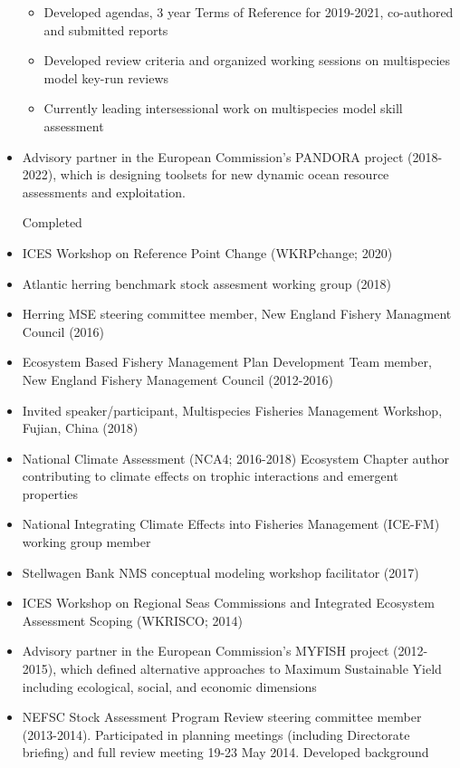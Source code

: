 \documentclass[11pt, a4paper]{awesome-cv}
\providecommand{\tightlist}{%
	\setlength{\itemsep}{0pt}\setlength{\parskip}{0pt}}
\begin{document}
\begin{itemize}
  \begin{itemize}
  \tightlist
  \item
    Developed agendas, 3 year Terms of Reference for 2019-2021,
    co-authored and submitted reports
  \item
    Developed review criteria and organized working sessions on
    multispecies model key-run reviews
  \item
    Currently leading intersessional work on multispecies model skill
    assessment
  \end{itemize}
\item
  Advisory partner in the European Commission's PANDORA project
  (2018-2022), which is designing toolsets for new dynamic ocean
  resource assessments and exploitation.

  Completed
\item
  ICES Workshop on Reference Point Change (WKRPchange; 2020)
\item
  Atlantic herring benchmark stock assesment working group (2018)
\item
  Herring MSE steering committee member, New England Fishery Managment
  Council (2016)
\item
  Ecosystem Based Fishery Management Plan Development Team member, New
  England Fishery Management Council (2012-2016)
\item
  Invited speaker/participant, Multispecies Fisheries Management
  Workshop, Fujian, China (2018)
\item
  National Climate Assessment (NCA4; 2016-2018) Ecosystem Chapter author
  contributing to climate effects on trophic interactions and emergent
  properties
\item
  National Integrating Climate Effects into Fisheries Management
  (ICE-FM) working group member
\item
  Stellwagen Bank NMS conceptual modeling workshop facilitator (2017)
\item
  ICES Workshop on Regional Seas Commissions and Integrated Ecosystem
  Assessment Scoping (WKRISCO; 2014)
\item
  Advisory partner in the European Commission's MYFISH project
  (2012-2015), which defined alternative approaches to Maximum
  Sustainable Yield including ecological, social, and economic
  dimensions
\item
  NEFSC Stock Assessment Program Review steering committee member
  (2013-2014). Participated in planning meetings (including Directorate
  briefing) and full review meeting 19-23 May 2014. Developed background

\end{itemize}
\end{document}
